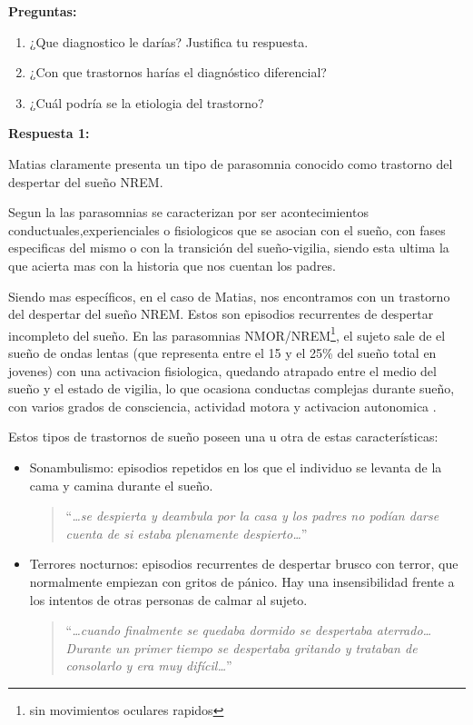 \documentclass[12pt,a4paper]{article}
\begin{document}
\textbf{Preguntas:}

\begin{enumerate}
	\item ¿Que diagnostico le darías? Justifica tu respuesta.
	\item ¿Con que trastornos harías el diagnóstico diferencial?
	\item ¿Cuál podría se la etiologia del trastorno?
\end{enumerate}

\vspace{1cm}

\textbf{Respuesta 1:}

Matias claramente presenta un tipo de parasomnia conocido como trastorno del despertar del sueño NREM. 

Segun la \textcite[p.399]{dsm} las parasomnias\label{parasomniasdef} se caracterizan por ser acontecimientos conductuales,experienciales o fisiologicos que se asocian con el sueño, con fases especificas del mismo o con la transición del sueño-vigilia, siendo esta ultima la que acierta mas con la historia que nos cuentan los padres.

Siendo mas específicos, en el caso de Matias, nos encontramos con un trastorno del despertar del sueño NREM. Estos son episodios recurrentes de despertar incompleto del sueño. En las parasomnias NMOR/NREM\footnote{sin movimientos oculares rapidos}, el sujeto sale de el sueño de ondas lentas (que representa entre el 15 y el 25\% del sueño total en jovenes) con una activacion fisiologica, quedando atrapado entre el medio del sueño y el estado de vigilia, lo que ocasiona conductas complejas durante sueño, con varios grados de consciencia, actividad motora y activacion autonomica \parencite{dsm}.

Estos tipos de trastornos de sueño poseen una u otra de estas características:

\begin{itemize}
    \item Sonambulismo: episodios repetidos en los que el individuo se levanta de la cama y camina durante el sueño. 
    \begin{quote}
        \enquote{\textit{\ldots se despierta y deambula por la casa y los padres no podían darse cuenta de si estaba plenamente despierto\ldots}}
    \end{quote}
    \item Terrores nocturnos: episodios recurrentes de despertar brusco con terror, que normalmente empiezan con gritos de pánico. Hay una insensibilidad frente a los intentos de otras personas de calmar al sujeto. 
    \begin{quote}
        \enquote{\textit{\ldots cuando finalmente se quedaba dormido se despertaba aterrado\ldots Durante un primer tiempo se despertaba gritando y trataban de consolarlo y era muy difícil\ldots}}
    \end{quote}
\end{itemize}
\end{document}
